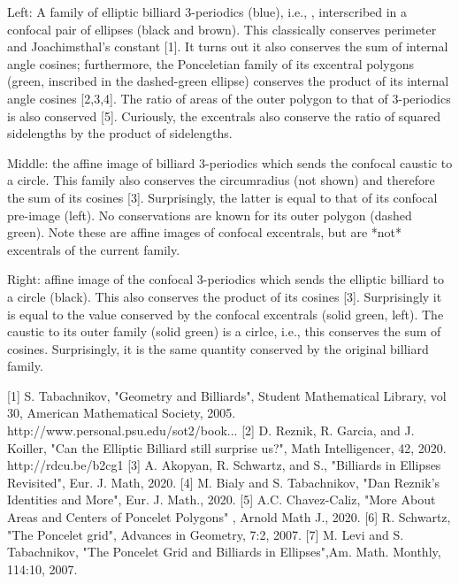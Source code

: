 Left: A family of elliptic billiard 3-periodics (blue), i.e., , interscribed in a confocal pair of  ellipses (black and brown). This classically conserves perimeter and Joachimsthal's constant [1].  It turns out it also conserves the sum of internal angle cosines; furthermore, the Ponceletian family of its excentral polygons (green, inscribed in the dashed-green ellipse) conserves the product of its internal angle cosines [2,3,4]. The ratio of areas of the outer polygon to that of 3-periodics is also conserved [5]. Curiously, the excentrals also conserve the ratio of squared sidelengths by the product of sidelengths.

Middle: the affine image of billiard 3-periodics which sends the confocal caustic to a circle. This family also conserves the circumradius (not shown) and therefore the sum of its cosines [3]. Surprisingly, the latter is equal to that of its confocal pre-image (left). No conservations are known for its outer polygon (dashed green). Note these are affine images of confocal  excentrals, but are *not* excentrals of the current family.

Right: affine image of the confocal 3-periodics which sends the elliptic billiard to a circle (black). This also conserves the product of its cosines [3]. Surprisingly it is equal to the value conserved by the confocal excentrals (solid green, left). The caustic to its outer family (solid green) is a cirlce, i.e., this conserves the sum of cosines. Surprisingly, it is the same quantity conserved by the original billiard family.

[1] S. Tabachnikov, "Geometry and Billiards", Student Mathematical Library, vol 30, American Mathematical Society, 2005. http://www.personal.psu.edu/sot2/book...​
[2] D. Reznik, R. Garcia, and J. Koiller, "Can the Elliptic Billiard still surprise us?", Math Intelligencer, 42, 2020. http://rdcu.be/b2cg1​​
[3] A. Akopyan, R. Schwartz, and S., "Billiards in Ellipses Revisited", Eur. J. Math, 2020. 
[4] M. Bialy and S. Tabachnikov, "Dan Reznik's Identities and More",
Eur. J. Math., 2020.
[5] A.C. Chavez-Caliz, "More About Areas and Centers of Poncelet Polygons" , Arnold Math J., 2020.
[6] R. Schwartz,  "The Poncelet grid", Advances in Geometry, 7:2, 2007.
[7] M. Levi and  S. Tabachnikov, "The Poncelet Grid and Billiards in Ellipses",Am. Math. Monthly,  114:10, 2007.